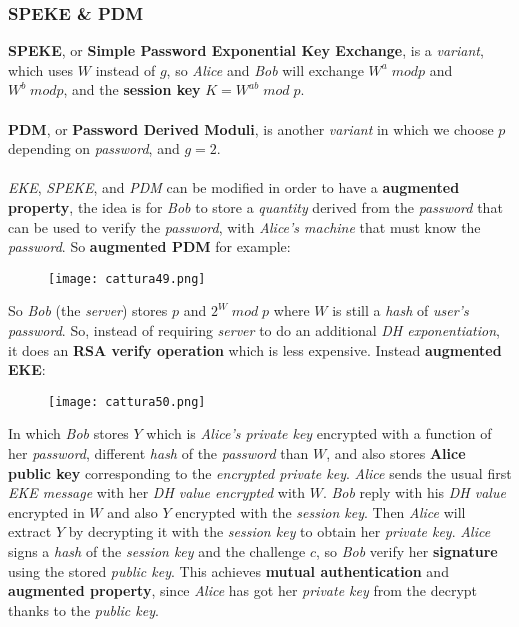 \documentclass{article}
\begin{document}
\subsubsection{SPEKE \& PDM}
\textbf{SPEKE}, or \textbf{Simple Password Exponential Key Exchange}, is a \emph{variant}, which uses $W$ instead of $g$, so \emph{Alice} and \emph{Bob} will exchange $W^a\; mod p$ and $W^b\; mod p$, and the \textbf{session key} $K=W^{ab}\; mod\; p$. \\\\
\textbf{PDM}, or \textbf{Password Derived Moduli}, is another \emph{variant} in which we choose $p$ depending on \emph{password}, and $g=2$. \\\\
\emph{EKE}, \emph{SPEKE}, and \emph{PDM} can be modified in order to have a \textbf{augmented property}, the idea is for \emph{Bob} to store a \emph{quantity} derived from the \emph{password} that can be used to verify the \emph{password}, with \emph{Alice's machine} that must know the \emph{password}. So \textbf{augmented PDM} for example:
\begin{figure}[H]
  \centering
  \texttt{[image: cattura49.png]}
\end{figure}
So \emph{Bob} (the \emph{server}) stores $p$ and $2^W\; mod\; p$ where $W$ is still a \emph{hash} of \emph{user's password}. So, instead of requiring \emph{server} to do an additional \emph{DH exponentiation}, it does an \textbf{RSA verify operation }which is less expensive. Instead \textbf{augmented EKE}:
\begin{figure}[H]
  \centering
  \texttt{[image: cattura50.png]}
\end{figure}
In which \emph{Bob} stores $Y$ which is \emph{Alice's private key} encrypted with a function of her \emph{password}, different \emph{hash} of the \emph{password} than $W$, and also stores \textbf{Alice public key} corresponding to the \emph{encrypted private key}. \emph{Alice} sends the usual first \emph{EKE message} with her \emph{DH value encrypted} with $W$. \emph{Bob} reply with his \emph{DH value} encrypted in $W$ and also $Y$ encrypted with the \emph{session key}. Then \emph{Alice} will extract $Y$ by decrypting it with the \emph{session key} to obtain her \emph{private key}. \emph{Alice} signs a \emph{hash} of the \emph{session key} and the challenge $c$, so \emph{Bob} verify her \textbf{signature} using the stored \emph{public key}. This achieves \textbf{mutual authentication} and \textbf{augmented property}, since \emph{Alice} has got her \emph{private key} from the decrypt thanks to the \emph{public key}. 
\clearpage
\end{document}
